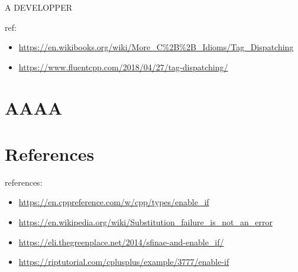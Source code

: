 \documentclass[11pt,a4paper]{article}
\begin{document}
A DEVELOPPER

ref:
\begin{itemize}
\item \url{https://en.wikibooks.org/wiki/More_C%2B%2B_Idioms/Tag_Dispatching}
\item \url{https://www.fluentcpp.com/2018/04/27/tag-dispatching/}
\end{itemize}

\section{AAAA}

\section{References}


references:
\begin{itemize}
\item \url{https://en.cppreference.com/w/cpp/types/enable_if}
\item \url{https://en.wikipedia.org/wiki/Substitution_failure_is_not_an_error}
\item \url{https://eli.thegreenplace.net/2014/sfinae-and-enable_if/}
\item \url{https://riptutorial.com/cplusplus/example/3777/enable-if}
\end{itemize}
\end{document}
